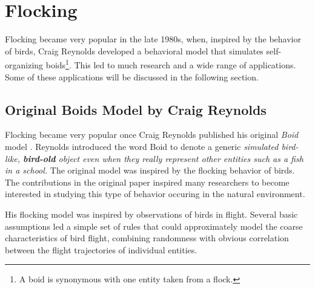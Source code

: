 





\section{Flocking}
Flocking became very popular in the late 1980s, when, inspired by the behavior of birds, Craig Reynolds developed a behavioral model that simulates self-organizing boids\footnote{A boid is synonymous with one entity taken from a flock.}. This led to much research and a wide range of applications. Some of these applications will be discussed in the following section.  

\subsection{Original Boids Model by Craig Reynolds}
Flocking became very popular once Craig Reynolds published his original \textit{Boid} model \cite{craig1}. Reynolds introduced the word Boid to denote a generic \textit{simulated bird-like, \textbf{bird-old} object even when they really represent other entities such as a fish in a school.} The original model was inspired by the flocking behavior of birds. The contributions in the original paper inspired many researchers to become interested in studying this type of behavior occuring in the natural environment. 

His flocking model was inspired by observations of birds in flight. Several basic assumptions led a simple set of rules that could approximately model the coarse characteristics of bird flight, combining randomness with obvious correlation between the flight trajectories of individual entities.  

